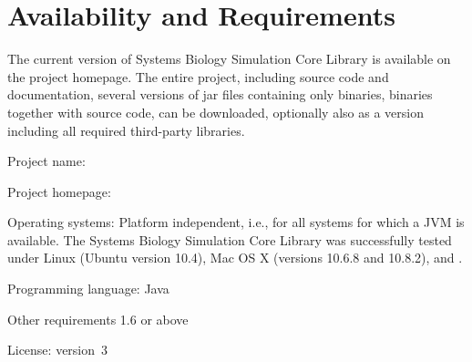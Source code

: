 \documentclass[10pt]{bmc_article}
\newenvironment{bmcformat}{\fussy\setboolean{publ}{true}}{\fussy}
\begin{document}
\begin{bmcformat}

\section*{Availability and Requirements}
The current version of Systems Biology Simulation Core Library is available on the project homepage. The entire project, including source code and documentation, several versions of jar files containing only binaries, binaries together with source code, can be downloaded, optionally also as a version including all required third-party libraries.
\begin{description}
  \item{Project name:}         
  \item{Project homepage:}     
  \item{Operating systems:}    Platform independent, i.e., for all systems for which a JVM
    is available. The Systems Biology Simulation Core Library was successfully 
    tested under Linux (Ubuntu version 10.4), Mac OS X (versions 10.6.8 and 10.8.2),
    and .
  \item{Programming language:} Java\texttrademark
  \item{Other requirements}     1.6 or above
  \item{License:}               version~3
\end{description}


\end{bmcformat}
\end{document}
